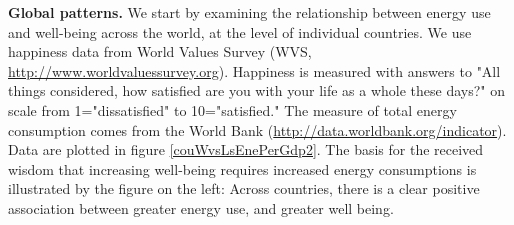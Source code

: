 \documentclass[10pt, letterpaper]{article}
\begin{document}
\begin{spacing}{1.4}






\textbf{Global patterns.} We start by examining the relationship between energy use and well-being across the world, at the level of individual countries.  %
We use happiness data from World Values Survey
(WVS, \url{http://www.worldvaluessurvey.org}).  Happiness is measured with answers to
"All things considered, how satisfied are you with your life as a whole these
days?" on scale from 1="dissatisfied" to 10="satisfied."
The measure of total energy  consumption comes from the World Bank
(\url{http://data.worldbank.org/indicator}). Data are plotted in figure \ref{couWvsLsEnePerGdp2}.
% 
%
The basis for the received wisdom that increasing well-being requires increased energy consumptions is illustrated by the figure on the left: Across countries, there is a clear positive association between greater energy use, and greater well being.


\end{spacing}
\end{document}

